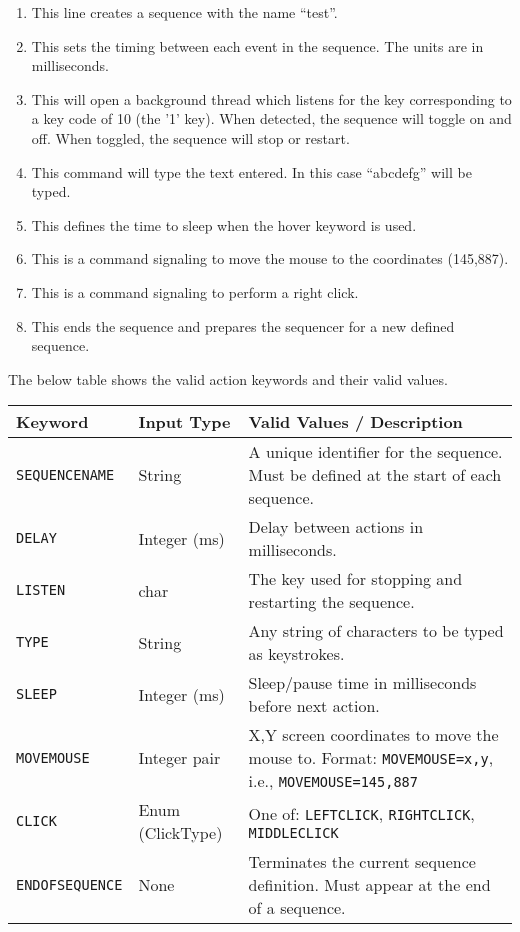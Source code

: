 \begin{enumerate}
	\item {} This line creates a sequence with the name ``test''.
	\item {} This sets the timing between each event in the sequence. The units are in milliseconds.
	\item {} This will open a background thread which listens for the key corresponding to a key code of 10 (the '1' key). When detected, the sequence will toggle on and off. When toggled, the sequence will stop or restart. 
	\item {} This command will type the text entered. In this case ``abcdefg'' will be typed.
	\item {} This defines the time to sleep when the hover keyword is used.
	\item {} This is a command signaling to move the mouse to the coordinates (145,887).
	\item {} This is a command signaling to perform a right click.
	\item {} This ends the sequence and prepares the sequencer for a new defined sequence.
\end{enumerate}

The below table shows the valid action keywords and their valid values.

\begin{table}[h]
	\centering
	\label{tab:sequencer_keywords}
	\begin{tabularx}{\textwidth}{|l|l|X|}
		\hline
		\textbf{Keyword} & \textbf{Input Type} & \textbf{Valid Values / Description} \\
		\hline
		\texttt{SEQUENCENAME} & String & A unique identifier for the sequence. Must be defined at the start of each sequence. \\
		\hline
		\texttt{DELAY} & Integer (ms) & Delay between actions in milliseconds.  \\
		\hline
		\texttt{LISTEN} & char & The key used for stopping and restarting the sequence.  \\
		\hline
		\texttt{TYPE} & String & Any string of characters to be typed as keystrokes. \\
		\hline
		\texttt{SLEEP} & Integer (ms) & Sleep/pause time in milliseconds before next action. \\
		\hline
		\texttt{MOVEMOUSE} & Integer pair & X,Y screen coordinates to move the mouse to. Format: \texttt{MOVEMOUSE=x,y}, i.e., \texttt{MOVEMOUSE=145,887} \\
		\hline
		\texttt{CLICK} & Enum (ClickType) & One of: \texttt{LEFTCLICK}, \texttt{RIGHTCLICK}, \texttt{MIDDLECLICK} \\
		\hline
		\texttt{ENDOFSEQUENCE} & None & Terminates the current sequence definition. Must appear at the end of a sequence. \\
		\hline
	\end{tabularx}
\end{table}


